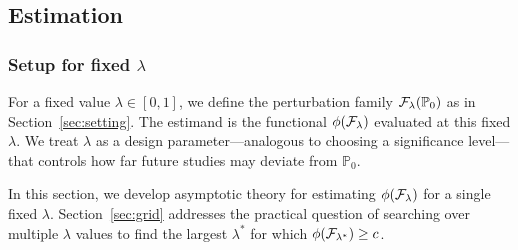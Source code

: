 \documentclass{article}
\newtheorem{remark}{Remark}
\newcommand{\PP}{\mathbb{P}}
\begin{document}
%
%

\subsection{Estimation}\label{sec:estimation}

\subsubsection{Setup for fixed $\lambda$}

For a fixed value $\lambda \in [0,1]$, we define the perturbation family
$\cF_\lambda(\PP_0)$ as in Section~\ref{sec:setting}. The estimand is the functional
$\phi(\mathcal{F}_\lambda)$ evaluated at this fixed $\lambda$. We treat $\lambda$
as a design parameter—analogous to choosing a significance level—that
controls how far future studies may deviate from $\PP_0$.

In this section, we develop asymptotic theory for estimating $\phi(\mathcal{F}_\lambda)$
for a single fixed $\lambda$. Section~\ref{sec:grid} addresses the practical
question of searching over multiple $\lambda$ values to find the largest
$\lambda^*$ for which $\phi(\mathcal{F}_{\lambda^*}) \geq c$.
\end{document}
